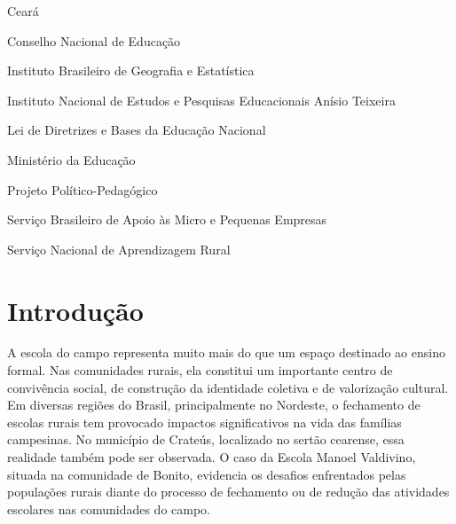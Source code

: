 \documentclass[
  12pt,
  openright,
  twoside,
  a4paper,
  english,
  brazilian,
  sumario=tradicional
]{abntex2}
\begin{document}
\begin{siglas}
  \item[CE] Ceará
  \item[CNE] Conselho Nacional de Educação
  \item[IBGE] Instituto Brasileiro de Geografia e Estatística
  \item[INEP] Instituto Nacional de Estudos e Pesquisas Educacionais Anísio Teixeira
  \item[LDB] Lei de Diretrizes e Bases da Educação Nacional
  \item[MEC] Ministério da Educação
  \item[PPP] Projeto Político-Pedagógico
  \item[SEBRAE] Serviço Brasileiro de Apoio às Micro e Pequenas Empresas
  \item[SENAR] Serviço Nacional de Aprendizagem Rural
\end{siglas}

\tableofcontents*
\cleardoublepage


\textual

\renewcommand{\thesection}{\arabic{section}}
\renewcommand{\thesubsection}{\arabic{section}.\arabic{subsection}}

\section{Introdução}
A escola do campo representa muito mais do que um espaço destinado ao ensino formal. Nas comunidades rurais, ela constitui um importante centro de convivência social, de construção da identidade coletiva e de valorização cultural. Em diversas regiões do Brasil, principalmente no Nordeste, o fechamento de escolas rurais tem provocado impactos significativos na vida das famílias campesinas. No município de Crateús, localizado no sertão cearense, essa realidade também pode ser observada. O caso da Escola Manoel Valdivino, situada na comunidade de Bonito, evidencia os desafios enfrentados pelas populações rurais diante do processo de fechamento ou de redução das atividades escolares nas comunidades do campo.
\end{document}
